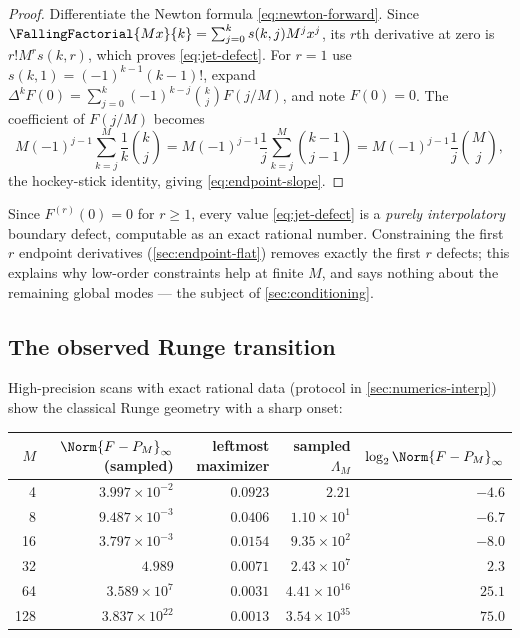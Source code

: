 \begin{proof}
Differentiate the Newton formula \eqref{eq:newton-forward}.  Since
$\FallingFactorial{Mx}{k}=\sum_{j=0}^k s(k,j)M^jx^j$, its $r$th derivative at zero
is $r!M^rs(k,r)$, which proves \eqref{eq:jet-defect}.  For $r=1$ use
$s(k,1)=(-1)^{k-1}(k-1)!$, expand
$\Delta^kF(0)=\sum_{j=0}^k(-1)^{k-j}\binom{k}{j}F(j/M)$, and note
$F(0)=0$.  The coefficient of $F(j/M)$ becomes
\[
 M(-1)^{j-1}\sum_{k=j}^M\frac1k\binom{k}{j}
 =M(-1)^{j-1}\frac1j\sum_{k=j}^M\binom{k-1}{j-1}
 =M(-1)^{j-1}\frac1j\binom{M}{j},
\]
the hockey-stick identity, giving \eqref{eq:endpoint-slope}.
\end{proof}

Since $F^{(r)}(0)=0$ for $r\ge1$, every value
\eqref{eq:jet-defect} is a \emph{purely interpolatory} boundary
defect, computable as an exact rational number.  Constraining the
first $r$ endpoint derivatives (\cref{sec:endpoint-flat}) removes
exactly the first $r$ defects; this explains why low-order constraints
help at finite $M$, and says nothing about the remaining global modes
--- the subject of \cref{sec:conditioning}.

\subsection{The observed Runge transition}
\label{sec:ordinary-numerics}

High-precision scans with exact rational data (protocol in
\cref{sec:numerics-interp}) show the classical Runge geometry with a
sharp onset:

\begin{center}
\small
\begin{tabular}{rrrrr}
\toprule
$M$ & $\Norm{F-P_M}_\infty$ (sampled) & leftmost maximizer &
sampled $\Lambda_M$ & $\log_2\Norm{F-P_M}_\infty$ \\
\midrule
4   & $3.997\times10^{-2}$ & $0.0923$ & $2.21$ & $-4.6$ \\
8   & $9.487\times10^{-3}$ & $0.0406$ & $1.10\times10^{1}$ & $-6.7$ \\
16  & $3.797\times10^{-3}$ & $0.0154$ & $9.35\times10^{2}$ & $-8.0$ \\
32  & $4.989$              & $0.0071$ & $2.43\times10^{7}$ & $2.3$ \\
64  & $3.589\times10^{7}$  & $0.0031$ & $4.41\times10^{16}$ & $25.1$ \\
128 & $3.837\times10^{22}$ & $0.0013$ & $3.54\times10^{35}$ & $75.0$ \\
\bottomrule
\end{tabular}
\label{tab:ordinary-errors}
\end{center}

